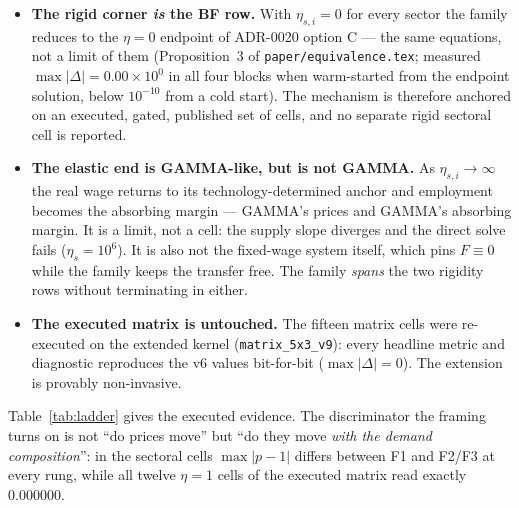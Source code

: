 \documentclass[11pt]{article}
\begin{document}
\begin{itemize}
\item \textbf{The rigid corner \emph{is} the BF row.} With $\eta_{s,i} = 0$ for
      every sector the family reduces to the $\eta = 0$ endpoint of ADR-0020
      option C --- the same equations, not a limit of them
      (Proposition~3 of \texttt{paper/equivalence.tex}; measured
      $\max|\Delta| = 0.00\times10^{0}$ in all four blocks when warm-started
      from the endpoint solution, below $10^{-10}$ from a cold start). The
      mechanism is therefore anchored on an executed, gated, published set of
      cells, and no separate rigid sectoral cell is reported.
\item \textbf{The elastic end is GAMMA-like, but is not GAMMA.} As
      $\eta_{s,i} \to \infty$ the real wage returns to its technology-determined
      anchor and employment becomes the absorbing margin --- GAMMA's prices and
      GAMMA's absorbing margin. It is a limit, not a cell: the supply slope
      diverges and the direct solve fails ($\eta_s = 10^6$). It is also not the
      fixed-wage system itself, which pins $F \equiv 0$ while the family keeps
      the transfer free. The family \emph{spans} the two rigidity rows without
      terminating in either.
\item \textbf{The executed matrix is untouched.} The fifteen matrix cells were
      re-executed on the extended kernel (\texttt{matrix\_5x3\_v9}): every
      headline metric and diagnostic reproduces the v6 values bit-for-bit
      ($\max|\Delta| = 0$). The extension is provably non-invasive.
\end{itemize}

Table~\ref{tab:ladder} gives the executed evidence. The discriminator the
framing turns on is not ``do prices move'' but ``do they move \emph{with the
demand composition}'': in the sectoral cells $\max|p-1|$ differs between F1 and
F2/F3 at every rung, while all twelve $\eta = 1$ cells of the executed matrix
read exactly $0.000000$.
\end{document}
